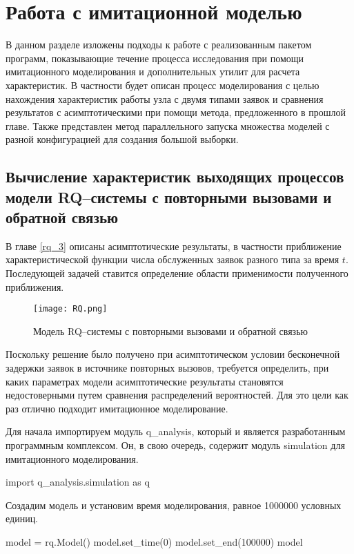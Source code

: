 \section{Работа с имитационной моделью}
В данном разделе изложены подходы к работе с реализованным пакетом программ, показывающие течение процесса исследования при помощи имитационного моделирования и дополнительных утилит для расчета характеристик. В частности будет описан процесс моделирования с целью нахождения характеристик работы узла с двумя типами заявок и сравнения результатов с асимптотическими при помощи метода, предложенного в прошлой главе. Также представлен метод параллельного запуска множества моделей с разной конфигурацией для создания большой выборки.
\subsection{Вычисление характеристик выходящих процессов модели RQ--системы с повторными вызовами и обратной связью}

В главе \ref{rq_3} описаны асимптотические результаты, в частности приближение характеристической функции числа обслуженных заявок разного типа за время $t$. Последующей задачей ставится определение области применимости полученного приближения. 

\begin{figure}[H]
	\centering
	\texttt{[image: RQ.png]}
	\caption{Модель RQ--системы с повторными вызовами и обратной связью} \label{rq_system}
\end{figure}

Поскольку решение было получено при асимптотическом условии бесконечной задержки заявок в источнике повторных вызовов, требуется определить, при каких параметрах модели асимптотические результаты становятся недостоверными путем сравнения распределений вероятностей. Для это цели как раз отлично подходит имитационное моделирование.

Для начала импортируем модуль q\_analysis, который и является разработанным программным комплексом. Он, в свою очередь, содержит модуль simulation для имитационного моделирования.
\begin{pyin}
	import q_analysis.simulation as q
\end{pyin}
Создадим модель и установим время моделирования, равное 1000000 условных единиц.
\begin{pyin} 
model = rq.Model()
model.set_time(0) 
model.set_end(100000)
model
\end{pyin}

